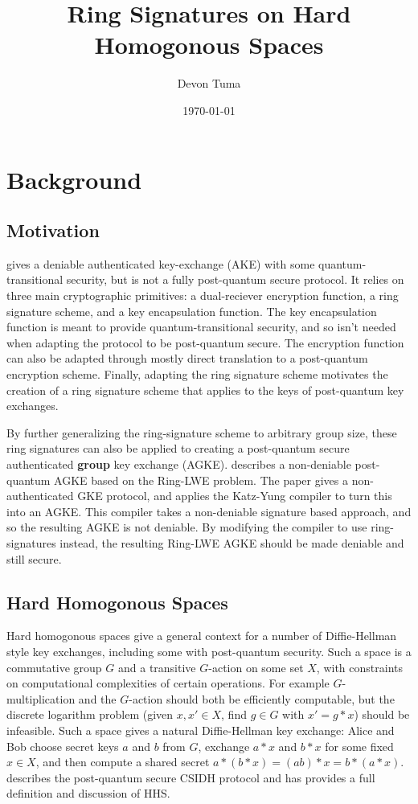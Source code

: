 \documentclass[11pt]{article}
\title{Ring Signatures on Hard Homogonous Spaces}
\author{Devon Tuma}
\date{\today}
\begin{document}
\maketitle


\section*{Background}

\subsection*{Motivation}

\cite{deniableAKE} gives a deniable authenticated key-exchange (AKE) with some quantum-transitional security, but is not a fully post-quantum secure protocol.
It relies on three main cryptographic primitives: a dual-reciever encryption function, a ring signature scheme, and a key encapsulation function.
The key encapsulation function is meant to provide quantum-transitional security, and so isn't needed when adapting the protocol to be post-quantum secure.
The encryption function can also be adapted through mostly direct translation to a post-quantum encryption scheme.
Finally, adapting the ring signature scheme motivates the creation of a ring signature scheme that applies to the keys of post-quantum key exchanges.

By further generalizing the ring-signature scheme to arbitrary group size, these ring signatures can also be applied to creating a post-quantum secure authenticated \textbf{group} key exchange (AGKE).
\cite{latticeAGKE} describes a non-deniable post-quantum AGKE based on the Ring-LWE problem.
The paper gives a non-authenticated GKE protocol, and applies the Katz-Yung compiler \cite{KYcompiler} to turn this into an AGKE.
This compiler takes a non-deniable signature based approach, and so the resulting AGKE is not deniable.
By modifying the compiler to use ring-signatures instead, the resulting Ring-LWE AGKE should be made deniable and still secure.

\subsection*{Hard Homogonous Spaces}

Hard homogonous spaces give a general context for a number of Diffie-Hellman style key exchanges, including some with post-quantum security.
Such a space is a commutative group $G$ and a transitive $G$-action on some set $X$, with constraints on computational complexities of certain operations.
For example $G$-multiplication and the $G$-action should both be efficiently computable, but the discrete logarithm problem (given $x,x' \in X$, find $g \in G$ with $x' = g * x$) should be infeasible.
Such a space gives a natural Diffie-Hellman key exchange: Alice and Bob choose secret keys $a$ and $b$ from $G$, exchange $a * x$ and $b * x$ for some fixed $x \in X$, and then compute a shared secret $a * (b * x) = (ab) * x = b * (a * x)$.
\cite{CSIDH} describes the post-quantum secure CSIDH protocol and has provides a full definition and discussion of HHS.
\end{document}
